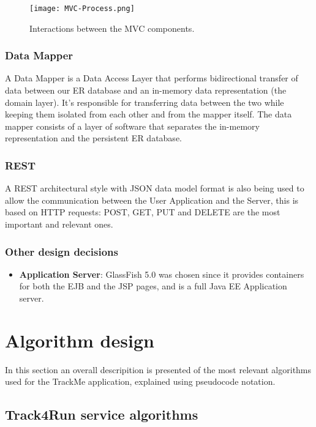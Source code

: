 \documentclass[12pt]{article}
\begin{document}
\begin{figure}[H]
    \centering
    \texttt{[image: MVC-Process.png]}
    \caption{Interactions between the MVC components.}
    \label{fig:MVC-Process}
\end{figure}

\subsubsection{Data Mapper}
A Data Mapper is a Data Access Layer that performs bidirectional transfer of data between our ER 
database and an in-memory data representation (the domain layer). It's responsible 
for transferring data between the two while keeping them isolated from each other and from the mapper
itself. The data mapper consists of a layer of software that separates the in-memory representation and 
the persistent ER database. 

\subsubsection{REST}
A REST architectural style with JSON data model format is also being used to allow the communication 
between the User Application and the Server, this is based on HTTP requests: POST, GET, PUT and 
DELETE are the most important and relevant ones.

\subsubsection{Other design decisions}

\begin{itemize}
    \item \textbf{Application Server}: GlassFish 5.0 was chosen since it provides containers
          for both the EJB and the JSP pages, and is a full Java EE Application server.
\end{itemize}



 
\section{Algorithm design}
In this section an overall descripition is presented of the most relevant algorithms used for the TrackMe 
application, explained using pseudocode notation. 
\subsection{Track4Run service algorithms}
\end{document}
